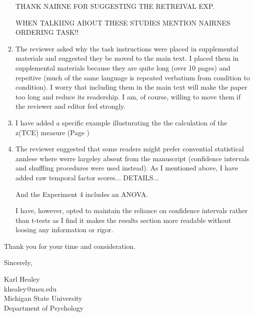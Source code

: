\documentclass[12pt]{article}
\begin{document}
\begin{enumerate}
	THANK NAIRNE FOR SUGGESTING THE RETREIVAL EXP. 

	WHEN TALKIING ABOUT THESE STUDIES MENTION NAIRNES ORDERING TASK!!

	\item
	The reviewer asked why the task instructions were placed in supplemental materials and suggested they be moved to the main text. I placed them in supplemental materials because they are quite long (over 10 pages) and repeitive (much of the same language is repeated verbatium from condition to condition). I worry that including them in the main text will make the paper too long and reduce its readership. I am, of course, willing to move them if the reviewer and editor feel strongly.

	\item
	I have added a specific example illusturating the the calculation of the z(TCE) measure  (Page \pageref{TODO-15})

	\item
	The reviewer suggested that some readers might prefer convential statistical annlese where werre largeley absent from the manuscript (confidence intervals and shuffling procedures were used instead). As I mentioned above, I have added raw temporal factor scores... DETAILS... 

	And the Experiment 4 includes an ANOVA.

	I have, however, opted to maintain the reliance on confidence intervals rather than t-tests as I find it makes the results section more readable without loosing any information or rigor. 



	

\end{enumerate}





\vspace{20pt}

Thank you for your time and consideration.

\vspace{10pt}

Sincerely,

\vspace{10pt}

Karl Healey\\
khealey@msu.edu\\
Michigan State University\\
Department of Psychology

%
\end{document}
